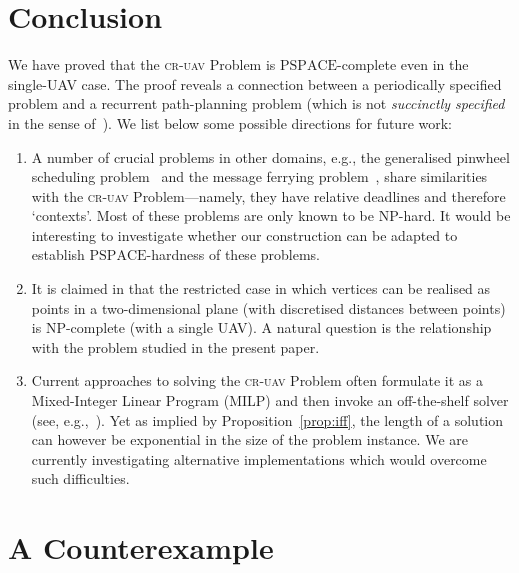 \documentclass[envcountsame]{llncs}
\begin{document}
\section{Conclusion}
We have proved that the \textsc{cr-uav} Problem is
$\mathrm{PSPACE}$-complete even in the single-UAV case.  The proof
reveals a 
connection between a periodically specified problem and a recurrent
path-planning problem (which is not \emph{succinctly specified} in the sense
of~\cite{Marathe1997}).  We list below some possible directions for
future work:

\begin{enumerate}

\item A number of crucial problems in other domains, e.g., the
  generalised pinwheel scheduling problem~\cite{Feinberg2005} and the message
  ferrying problem~\cite{Zhao2004}, share similarities with the
  \textsc{cr-uav} Problem---namely, they have relative deadlines and
  therefore `contexts'.  Most of these problems are only known to be
  $\mathrm{NP}$-hard. It would be interesting to investigate whether
  our construction can be adapted to establish
  $\mathrm{PSPACE}$-hardness of these problems.

\item It is claimed in \cite{Fargeas2013} that the restricted case
  in which vertices can be realised as points in a two-dimensional plane
  (with discretised distances between points) is $\mathrm{NP}$-complete (with a single UAV).
  A natural question is the relationship with the problem studied in the present paper.

\item Current approaches to solving the \textsc{cr-uav} Problem often
  formulate it as a Mixed-Integer Linear Program (MILP) and then
  invoke an off-the-shelf solver (see, e.g.,~\cite{Basilico2012}). Yet
  as implied by Proposition~\ref{prop:iff}, the length of a solution
  can however be exponential in the size of the problem
  instance. We are currently investigating alternative implementations
  which would overcome such difficulties.


\end{enumerate}


        

\newpage
\appendix

\section{A Counterexample}\label{app:cex}
\end{document}
